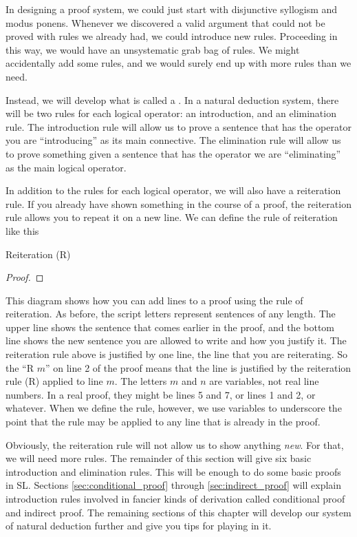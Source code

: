 In designing a proof system, we could just start with disjunctive syllogism and modus ponens. Whenever we discovered a valid argument that could not be proved with rules we already had, we could introduce new rules. Proceeding in this way, we would have an unsystematic grab bag of rules. We might accidentally add some rules, and we would surely end up with more rules than we need.

Instead, we will develop what is called a . In a natural deduction system, there will be two rules for each logical operator: an introduction, and an elimination rule. The introduction rule will allow us to prove a sentence that has the operator you are ``introducing'' as its main connective. The elimination rule will allow us to prove something given a sentence that has the operator we are ``eliminating'' as the main logical operator.

In addition to the rules for each logical operator, we will also have a reiteration rule. If you already have shown something in the course of a proof, the reiteration rule allows you to repeat it on a new line. We can define the rule of reiteration like this

Reiteration (R)
\begin{proof}
	 
\end{proof}

This diagram shows how you can add lines to a proof using the rule of reiteration. As before, the script letters represent sentences of any length. The upper line shows the sentence that 
comes earlier in the proof, and the bottom line shows the new sentence you are allowed to write and how you justify it. The reiteration rule above is justified by one line, the line that 
you are reiterating. So the ``R $m$'' on line 2 of the proof means that the line is justified by the reiteration rule (R) applied to line $m$. The letters $m$ and $n$ are variables, not 
real line numbers. In a real proof, they might be lines 5 and 7, or lines 1 and 2, or whatever. When we define the rule, however, we use variables to underscore the point that the rule 
may be applied to any line that is already in the proof.

Obviously, the reiteration rule will not allow us to show anything \emph{new}. For that, we will need more rules. The remainder of this section will give six basic introduction and 
elimination rules. This will be enough to do some basic proofs in SL. Sections \ref{sec:conditional_proof} through \ref{sec:indirect_proof} will explain introduction rules involved in 
fancier kinds of derivation called conditional proof and indirect proof. The remaining sections of this chapter will develop our system of natural deduction further and give you tips for 
playing in it.

